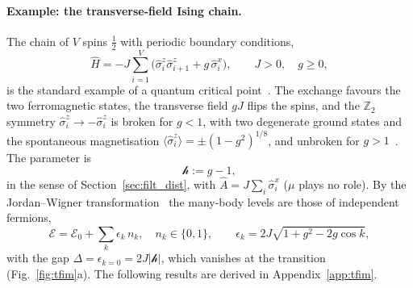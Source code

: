 \documentclass[10pt,a4paper]{article}
\theoremstyle{plain}
\newcommand{\hfield}{\mathscr{h}}  %
\newcommand{\enrg}{\mathcal{E}}  %
\begin{document}
\paragraph{Example: the transverse-field Ising chain.}
The chain of $V$ spins $\tfrac12$ with periodic boundary conditions,
\begin{equation}\label{eq:tfim_H}
  \hat H=-J\sum_{i=1}^{V}\big(\hat\sigma^{z}_i\hat\sigma^{z}_{i+1}+g\,\hat\sigma^{x}_i\big) ,
  \qquad J>0 ,\quad g\ge0 ,
\end{equation}
is the standard example of a quantum critical point~\cite{Sachdev2011}. The
exchange favours the two ferromagnetic states, the transverse field $gJ$
flips the spins, and the $\mathbb Z_2$ symmetry $\hat\sigma^{z}_i\to-\hat\sigma^{z}_i$
is broken for $g<1$, with two degenerate ground states and the spontaneous
magnetisation $\langle\hat\sigma^{z}_i\rangle=\pm(1-g^{2})^{1/8}$, and
unbroken for $g>1$~\cite{Pfeuty1970}. The parameter is
\[
  \hfield:=g-1 ,
\]
in the sense of Section~\ref{sec:filt_dist}, with $\hat A=J\sum_i\hat\sigma^{x}_i$
($\mu$ plays no role). By the Jordan--Wigner
transformation~\cite{LSM1961,Pfeuty1970} the many-body levels are those of
independent fermions,
\begin{equation}\label{eq:tfim_levels}
  \enrg=\enrg_0+\sum_k\epsilon_k\,n_k ,\quad n_k\in\{0,1\} ,
  \qquad
  \epsilon_k=2J\sqrt{1+g^{2}-2g\cos k} ,
\end{equation}
with the gap $\Delta=\epsilon_{k=0}=2J|\hfield|$, which vanishes at the
transition (Fig.~\ref{fig:tfim}a). The following results are derived in
Appendix~\ref{app:tfim}.
\end{document}

